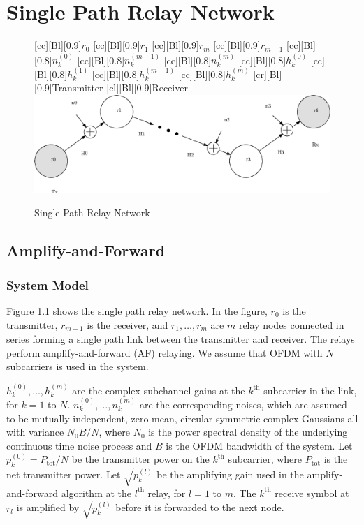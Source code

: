 \chapter{Single Path Relay Network}
\label{chap:sp}

\begin{figure}
  \centering
    [cc][Bl][0.9]{$r_0$}
    [cc][Bl][0.9]{$r_1$}
    [cc][Bl][0.9]{$r_m$}
    [cc][Bl][0.9]{$r_{m+1}$}
    [cc][Bl][0.8]{$n_k^{(0)}$}
    [cc][Bl][0.8]{$n_k^{(m-1)}$}
    [cc][Bl][0.8]{$n_k^{(m)}$}
    [cc][Bl][0.8]{$h_k^{(0)}$}
    [cc][Bl][0.8]{$h_k^{(1)}$}
    [cc][Bl][0.8]{$h_k^{(m-1)}$}
    [cc][Bl][0.8]{$h_k^{(m)}$}
    [cr][Bl][0.9]{Transmitter}
    [cl][Bl][0.9]{Receiver}
    \includegraphics[width=5in]{sp_model.eps}
   \caption{Single Path Relay Network \label{fig:sp_sm} }
\end{figure}

\section{Amplify-and-Forward}
\label{sec:sp_af}

\subsection{System Model}
\label{subsec:sp_af_sm}

Figure \ref{fig:sp_sm} shows the single path relay network.  In the figure, $r_0$ is the transmitter, $r_{m+1}$ is the receiver, and $r_1, \ldots, r_m$ are $m$ relay nodes connected in series forming a single path link between the transmitter and receiver.  The relays perform amplify-and-forward (AF) relaying.  We assume that OFDM with $N$ subcarriers is used in the system.

$h_k^{(0)}, \ldots, h_k^{(m)}$ are the complex subchannel gains at the $k^{\mbox{th}}$ subcarrier in the link, for $k = 1$ to $N$.   $n_k^{(0)}, \ldots, n_k^{(m)}$ are the corresponding noises, which are assumed to be mutually independent, zero-mean, circular symmetric complex Gaussians all with variance $N_0 B / N$, where $N_0$ is the power spectral density of the underlying continuous time noise process and $B$ is the OFDM bandwidth of the system.  Let $p_k^{(0)} = P_{\mbox{tot}} / N$ be the transmitter power on the $k^{\mbox{th}}$ subcarrier, where $P_{\mbox{tot}}$ is the net transmitter power.  Let  $\sqrt{p_k^{(l)}}$ be the amplifying gain used in the amplify-and-forward algorithm at the $l^{\mbox{th}}$ relay, for $l=1$ to $m$.  The $k^{\mbox{th}}$ receive symbol at $r_l$ is amplified by $\sqrt{p_k^{(l)}}$ before it is forwarded to the next node.

